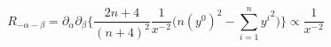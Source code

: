\begin{equation}
\label{Riemann}
R_{-\alpha
-\beta}=\partial_{\alpha}\partial_{\beta}\bigg\{\frac{2n+4}{(n+4)^2}\frac{1}{{x^-}^2}\Big(n(y^0)^2-\sum_{i=1}^{n}{y^i}^2\Big)\bigg\}
\propto \frac{1}{{x^-}^2}
\end{equation}

